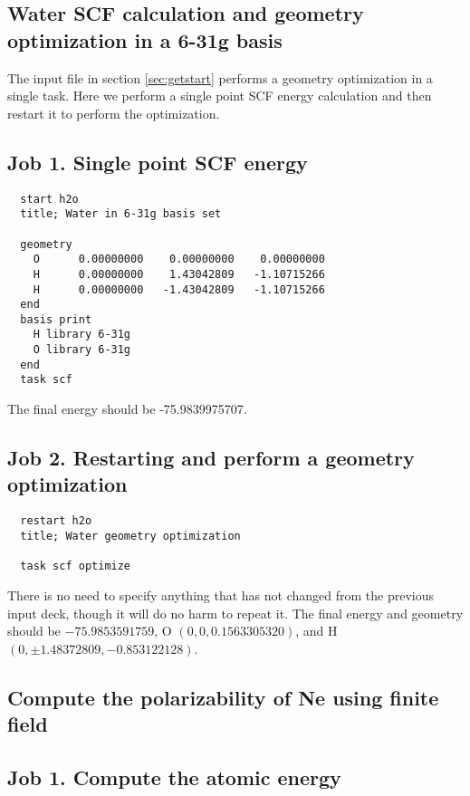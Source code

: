 \label{sec:sample}
\subsection{Water SCF calculation and geometry optimization in a 6-31g basis}

The input file in section \ref{sec:getstart} performs a geometry optimization
in a single task.  Here we perform a single point SCF energy calculation and then
restart it to perform the optimization.

\subsection{Job 1.  Single point SCF energy}

\begin{verbatim}
  start h2o
  title; Water in 6-31g basis set

  geometry
    O      0.00000000    0.00000000    0.00000000
    H      0.00000000    1.43042809   -1.10715266
    H      0.00000000   -1.43042809   -1.10715266
  end
  basis print
    H library 6-31g
    O library 6-31g
  end
  task scf
\end{verbatim}

The final energy should be -75.9839975707.

\subsection{Job 2. Restarting and perform a geometry optimization}

\begin{verbatim}
  restart h2o
  title; Water geometry optimization

  task scf optimize
\end{verbatim}

There is no need to specify anything that has not changed from the
previous input deck, though it will do no harm to repeat it.  The
final energy and geometry should be $-75.9853591759$, O
$(0,0,0.1563305320)$, and H $(0, \pm1.48372809, -0.853122128)$.

\subsection{Compute the polarizability of Ne using finite field}

\subsection{Job 1. Compute the atomic energy}

